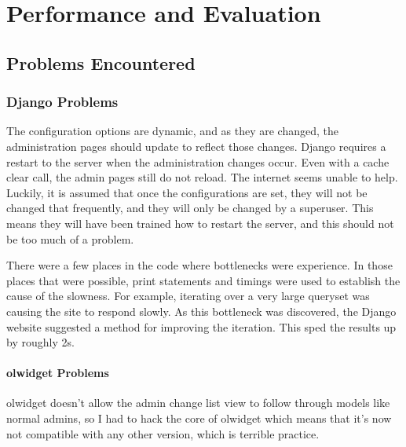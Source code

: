 \chapter{Performance and Evaluation}

\section{Problems Encountered}
\subsection{Django Problems}
The configuration options are dynamic, and as they are changed, the administration pages should update to reflect those changes. Django requires a restart to the server when the administration changes occur. Even with a cache clear call, the admin pages still do not reload. The internet seems unable to help. Luckily, it is assumed that once the configurations are set, they will not be changed that frequently, and they will only be changed by a superuser. This means they will have been trained how to restart the server, and this should not be too much of a problem.

There were a few places in the code where bottlenecks were experience. In those places that were possible, print statements and timings were used to establish the cause of the slowness. For example, iterating over a very large queryset was causing the site to respond slowly. As this bottleneck was discovered, the Django website suggested a method for improving the iteration. This sped the results up by roughly 2s.

\subsubsection{olwidget Problems}
olwidget doesn't allow the admin change list view to follow through models like normal admins, so I had to hack the core of olwidget which means that it's now not compatible with any other version, which is terrible practice.
